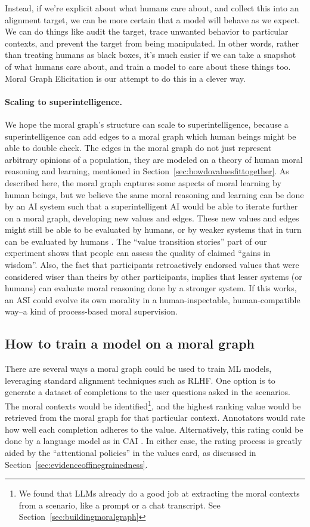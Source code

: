 \documentclass{article}
\theoremstyle{definition}
\begin{document}
Instead, if we're explicit about what humans care about, and collect this into an alignment target, we can be more certain that a model will behave as we expect. We can do things like audit the target, trace unwanted behavior to particular contexts, and prevent the target from being manipulated. In other words, rather than treating humans as black boxes, it’s much easier if we can take a snapshot of what humans care about, and train a model to care about these things too. Moral Graph Elicitation is our attempt to do this in a clever way. 

\paragraph{Scaling to superintelligence.} We hope the moral graph’s structure can scale to superintelligence, because a superintelligence can add edges to a moral graph which human beings might be able to double check. The edges in the moral graph do not just represent arbitrary opinions of a population, they are modeled on a theory of human moral reasoning and learning, mentioned in Section~\ref{sec:howdovaluesfittogether}. As described here, the moral graph captures some aspects of moral learning by human beings, but we believe the same moral reasoning and learning can be done by an AI system such that a superintelligent AI would be able to iterate further on a moral graph, developing new values and edges. These new values and edges might still be able to be evaluated by humans, or by weaker systems that in turn can be evaluated by humans \citep{burns2023weak}. The “value transition stories” part of our experiment shows that people can assess the quality of claimed “gains in wisdom”. Also, the fact that participants retroactively endorsed values that were considered wiser than theirs by other participants, implies that lesser systems (or humans) can evaluate moral reasoning done by a stronger system. If this works, an ASI could evolve its own morality in a human-inspectable, human-compatible way--a kind of process-based moral supervision. %

\subsection{How to train a model on a moral graph}\label{sec:training}
There are several ways a moral graph could be used to train ML models, leveraging standard alignment techniques such as RLHF. One option is to generate a dataset of completions to the user questions asked in the scenarios. The moral contexts would be identified\footnote{We found that LLMs already do a good job at extracting the moral contexts from a scenario, like a prompt or a chat transcript. See Section~\ref{sec:buildingmoralgraph}}, and the highest ranking value would be retrieved from the moral graph for that particular context. Annotators would rate how well each completion adheres to the value. Alternatively, this rating could be done by a language model as in CAI \citep{bai2022constitutional}. In either case, the rating process is greatly aided by the “attentional policies” in the values card, as discussed in Section~\ref{sec:evidenceoffinegrainedness}.
\end{document}
